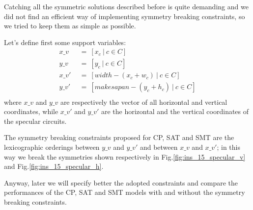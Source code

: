         Catching all the symmetric solutions described before is quite demanding and we did not find an 
        efficient way of implementing symmetry breaking constraints, so we tried to keep them as simple 
        as possible.

        Let's define first some support variables:
        \begin{align*}
            x\_v\   &\ =\ [x_c\ |\ c \in C]                     \\
            y\_v\   &\ =\ [y_c\ |\ c \in C]                     \\
            x\_v'\  &\ =\ [width - (x_c + w_c)\ |\ c \in C]     \\
            y\_v'\  &\ =\ [makesapan - (y_c + h_c)\ |\ c \in C] \\ 
            \label{eq:specular_coord}
        \end{align*}
        where $x\_v$ and $y\_v$ are respectively the vector of all horizontal and vertical coordinates,
        while $x\_v'$ and $y\_v'$ are the horizontal and the vertical coordinates of the specular circuits.

        The symmetry breaking constraints proposed for CP, SAT and SMT are the lexicographic orderings
        between $y\_v$ and $y\_v'$ and between $x\_v$ and $x\_v'$; in this way we break the 
        symmetries shown respectively in Fig.\ref{fig:ins_15_specular_v} and Fig.\ref{fig:ins_15_specular_h}.


        Anyway, later we will specify better the adopted constraints and compare the performances of the 
        CP, SAT and SMT models with and without the symmetry breaking constraints.
